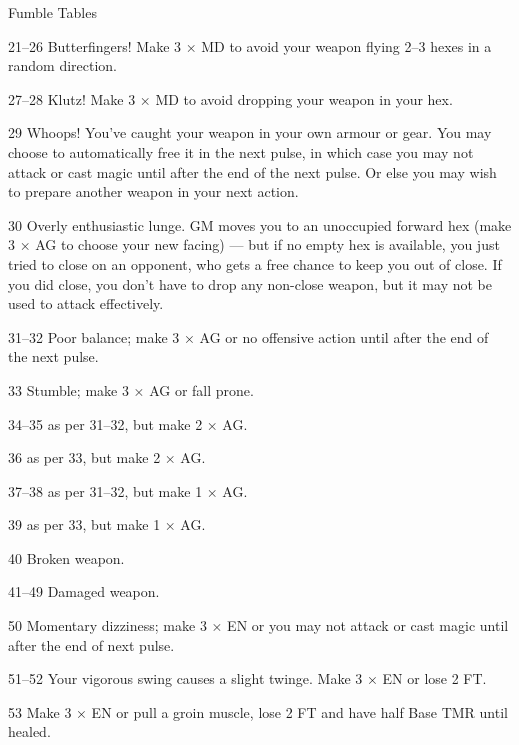 \begin{Chapter}{Fumble Tables}
\begin{Description}
\item[21–26] Butterfingers! Make 3 × MD to avoid your weapon flying
  2–3 hexes in a random direction.

\item[27–28] Klutz! Make 3 × MD to avoid dropping your weapon in your
  hex.

\item[29] Whoops! You’ve caught your weapon in your own armour or
  gear. You may choose to automatically free it in the next pulse, in
  which case you may not attack or cast magic until after the end of
  the next pulse. Or else you may wish to prepare another weapon in
  your next action.

\item[30] Overly enthusiastic lunge. GM moves you to an unoccupied
  forward hex (make 3 × AG to choose your new facing) — but if no
  empty hex is available, you just tried to close on an opponent, who
  gets a free chance to keep you out of close. If you did close, you
  don’t have to drop any non-close weapon, but it may not be used to
  attack effectively.

\item[31–32] Poor balance; make 3 × AG or no offensive action until
  after the end of the next pulse.

\item[33] Stumble; make 3 × AG or fall prone.

\item[34–35] as per 31–32, but make 2 × AG.

\item[36] as per 33, but make 2 × AG.

\item[37–38] as per 31–32, but make 1 × AG.

\item[39] as per 33, but make 1 × AG.

\item[40] Broken weapon.

\item[41–49] Damaged weapon.

\item[50] Momentary dizziness; make 3 × EN or you may not attack or
  cast magic until after the end of next pulse.

\item[51–52] Your vigorous swing causes a slight twinge.  Make 3 × EN
  or lose 2 FT.

\item[53] Make 3 × EN or pull a groin muscle, lose 2 FT and have half
  Base TMR until healed.


\end{Description}
\end{Chapter}
